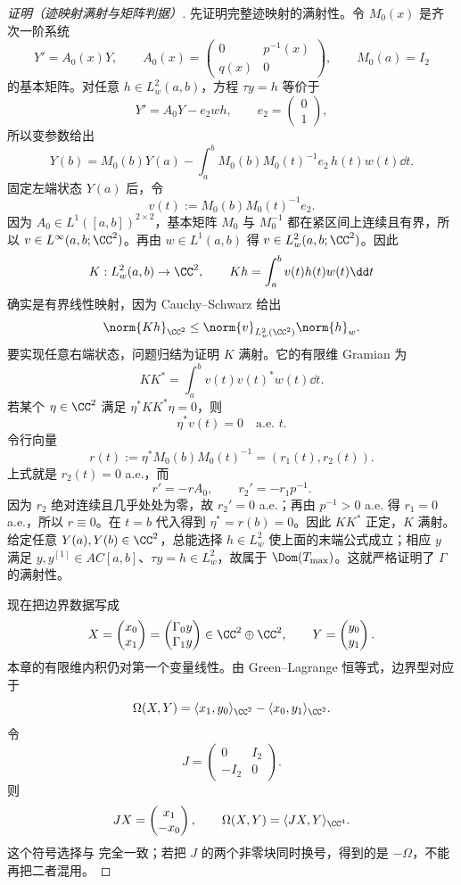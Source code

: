 \begin{proof}[证明（迹映射满射与矩阵判据）]
先证明完整迹映射的满射性。令 $M_0(x)$ 是齐次一阶系统
\[
 Y'=A_0(x)Y,
 \qquad
 A_0(x)=\begin{pmatrix}0&p^{-1}(x)\\q(x)&0\end{pmatrix},
 \qquad
 M_0(a)=I_2
\]
的基本矩阵。对任意 $h\in L^2_w(a,b)$，方程 $\tau y=h$ 等价于
\[
 Y'=A_0Y-e_2w h,
 \qquad e_2=\begin{pmatrix}0\\1\end{pmatrix},
\]
所以变参数给出
\[
 Y(b)=M_0(b)Y(a)-\int_a^b
 M_0(b)M_0(t)^{-1}e_2\,h(t)w(t)\dd t.
\]
固定左端状态 $Y(a)$ 后，令
\[
 v(t):=M_0(b)M_0(t)^{-1}e_2.
\]
因为 $A_0\in L^1([a,b])^{2\times2}$，基本矩阵 $M_0$ 与 $M_0^{-1}$ 都在紧区间上连续且有界，所以 $v\in L^\infty(a,b;\CC^2)$。再由 $w\in L^1(a,b)$ 得 $v\in L^2_w(a,b;\CC^2)$。因此
\[
 K:L^2_w(a,b)\to\CC^2,
 \qquad
 Kh=\int_a^b v(t)h(t)w(t)\dd t
\]
确实是有界线性映射，因为 Cauchy--Schwarz 给出
\[
 \norm{Kh}_{\CC^2}
 \le \norm{v}_{L^2_w(\CC^2)}\norm{h}_w.
\]
要实现任意右端状态，问题归结为证明 $K$ 满射。它的有限维 Gramian 为
\[
 KK^*=\int_a^b v(t)v(t)^*w(t)\dd t.
\]
若某个 $\eta\in\CC^2$ 满足 $\eta^*KK^*\eta=0$，则
\[
 \eta^*v(t)=0
 \quad\text{a.e. }t.
\]
令行向量
\[
 r(t):=\eta^*M_0(b)M_0(t)^{-1}=(r_1(t),r_2(t)).
\]
上式就是 $r_2(t)=0$ a.e.，而
\[
 r'=-rA_0,
 \qquad
 r_2'=-r_1p^{-1}.
\]
因为 $r_2$ 绝对连续且几乎处处为零，故 $r_2'=0$ a.e.；再由 $p^{-1}>0$ a.e. 得 $r_1=0$ a.e.，所以 $r\equiv0$。在 $t=b$ 代入得到 $\eta^*=r(b)=0$。因此 $KK^*$ 正定，$K$ 满射。给定任意 $Y(a),Y(b)\in\CC^2$，总能选择 $h\in L^2_w$ 使上面的末端公式成立；相应 $y$ 满足 $y,y^{[1]}\in AC[a,b]$、$\tau y=h\in L^2_w$，故属于 $\Dom(T_{\max})$。这就严格证明了 $\Gamma$ 的满射性。

现在把边界数据写成
\[
 X=\begin{pmatrix}x_0\\x_1\end{pmatrix}
 =\begin{pmatrix}\Gamma_0y\\\Gamma_1y\end{pmatrix}
 \in\CC^2\oplus\CC^2,
 \qquad
 Y=\begin{pmatrix}y_0\\y_1\end{pmatrix}.
\]
本章的有限维内积仍对第一个变量线性。由 Green--Lagrange 恒等式，边界型对应于
\[
 \Omega(X,Y)
 =\langle x_1,y_0\rangle_{\CC^2}
 -\langle x_0,y_1\rangle_{\CC^2}.
\]
令
\[
 J=\begin{pmatrix}0&I_2\\-I_2&0\end{pmatrix}.
\]
则
\[
 JX=\begin{pmatrix}x_1\\-x_0\end{pmatrix},
 \qquad
 \Omega(X,Y)=\langle JX,Y\rangle_{\CC^4}.
\]
这个符号选择与 完全一致；若把 $J$ 的两个非零块同时换号，得到的是 $-\Omega$，不能再把二者混用。


\end{proof}
